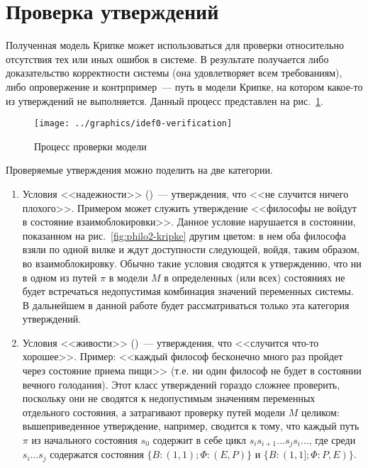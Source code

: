 \section{Проверка утверждений}
\label{sec:kripke-verification}

Полученная модель Крипке может использоваться для проверки относительно отсутствия тех или
иных ошибок в системе. В результате получается либо доказательство корректности системы
(она удовлетворяет всем требованиям), либо опровержение и контрпример~--- путь в модели
Крипке, на котором какое-то из утверждений не выполняется. Данный процесс представлен на
рис.~\ref{fig:idef0-verification}.

\begin{figure}[htb]
  \centering
  \texttt{[image: ../graphics/idef0-verification]}
  \caption{Процесс проверки модели}
  \label{fig:idef0-verification}
\end{figure}

Проверяемые утверждения можно поделить на две категории.
\begin{enumerate}
\item Условия <<надежности>> ()~--- утверждения, что <<не случится ничего
  плохого>>. Примером может служить утверждение <<философы не войдут в состояние
  взаимоблокировки>>. Данное условие нарушается в состоянии, показанном на
  рис.~\ref{fig:philo2-kripke} другим цветом: в нем оба философа взяли по одной вилке и
  ждут доступности следующей, войдя, таким образом, во взаимоблокировку. Обычно такие
  условия сводятся к утверждению, что ни в одном из путей $\pi$ в модели $M$ в
  определенных (или всех) состояниях не будет встречаться недопустимая комбинация значений
  переменных системы. В дальнейшем в данной работе будет рассматриваться только эта
  категория утверждений.
\item Условия <<живости>> ()~--- утверждения, что <<случится что-то
  хорошее>>. Пример: <<каждый философ бесконечно много раз пройдет через состояние приема
  пищи>> (т.е. ни один философ не будет в состоянии вечного голодания). Этот класс
  утверждений гораздо сложнее проверить, поскольку они не сводятся к недопустимым
  значениям переменных отдельного состояния, а затрагивают проверку путей модели $M$
  целиком: вышеприведенное утверждение, например, сводится к тому, что каждый путь $\pi$
  из начального состояния $s_0$ содержит в себе цикл $s_is_{i+1}\ldots s_js_i\ldots$, где
  среди $s_i\ldots s_j$ содержатся состояния $\{B: (1, 1); \Phi: (E, P)\}$ и $\{B: (1, 1];
  \Phi: P, E)\}$.
\end{enumerate}

